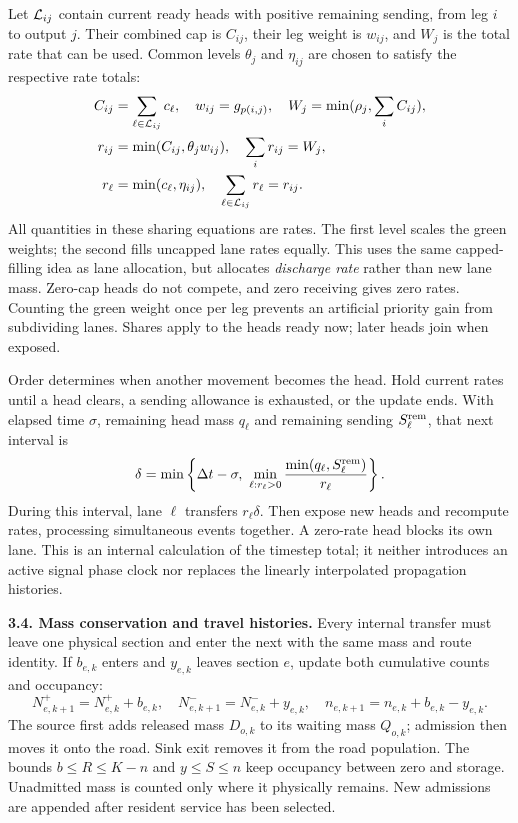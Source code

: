\documentclass[10pt,a4paper]{article}
\begin{document}
Let ${\cal L}_{ij}$ contain current ready heads with positive remaining
sending, from leg $i$ to output $j$. Their combined cap is $C_{ij}$, their leg weight is $w_{ij}$,
and $W_j$ is the total rate that can be used. Common levels $\theta_j$
and $\eta_{ij}$ are chosen to satisfy the respective rate totals:
\begin{align}
 C_{ij}&=\sum_{\ell\in{\cal L}_{ij}}c_\ell,\quad
 w_{ij}=g_{p(i,j)},\quad W_j=\min(\rho_j,\sum_iC_{ij}),\nonumber\\
 r_{ij}&=\min(C_{ij},\theta_jw_{ij}),\quad
                    \sum_i r_{ij}=W_j,\label{eq:compact-leg-sharing}\\
 r_\ell&=\min(c_\ell,\eta_{ij}),\quad
                    \sum_{\ell\in{\cal L}_{ij}}r_\ell=r_{ij}.
 \label{eq:compact-lane-sharing}
\end{align}
All quantities in these sharing equations are rates. The first level
scales the green weights; the second fills uncapped lane rates equally.
This uses the same capped-filling idea as lane allocation, but allocates
\emph{discharge rate} rather than new lane mass. Zero-cap heads do not
compete, and zero receiving gives zero rates. Counting the green weight
once per leg prevents an artificial priority gain from subdividing lanes.
Shares apply to the heads ready now; later heads join when exposed.

Order determines when another movement becomes the head. Hold current
rates until a head clears, a sending allowance is exhausted, or the
update ends. With elapsed time $\sigma$, remaining head mass $q_\ell$
and remaining sending $S_\ell^{\rm rem}$, that next interval is
\begin{equation}
 \delta=\min\left\{\Delta t-\sigma,\
 \min_{\ell:r_\ell>0}
       \frac{\min(q_\ell,S_\ell^{\rm rem})}{r_\ell}\right\}.
 \label{eq:compact-head-time}
\end{equation}
During this interval, lane $\ell$ transfers $r_\ell\delta$. Then expose
new heads and recompute rates, processing simultaneous events together.
A zero-rate head blocks its own lane. This is an internal calculation of
the timestep total; it neither introduces an active signal phase clock
nor replaces the linearly interpolated propagation histories.

\textbf{3.4. Mass conservation and travel histories.}
Every internal transfer must leave one physical section and enter the
next with the same mass and route identity. If $b_{e,k}$ enters and
$y_{e,k}$ leaves section $e$, update both cumulative counts and occupancy:
\begin{equation}
 N^+_{e,k+1}=N^+_{e,k}+b_{e,k},\quad
 N^-_{e,k+1}=N^-_{e,k}+y_{e,k},\quad
 n_{e,k+1}=n_{e,k}+b_{e,k}-y_{e,k}.
 \label{eq:compact-update}
\end{equation}
The source first adds released mass $D_{o,k}$ to its waiting mass $Q_{o,k}$;
admission then moves it onto the road. Sink exit removes it from the
road population. The bounds $b\leq R\leq K-n$ and $y\leq S\leq n$
keep occupancy between zero and storage. Unadmitted mass is counted
only where it physically remains. New admissions are appended after
resident service has been selected.
\end{document}

